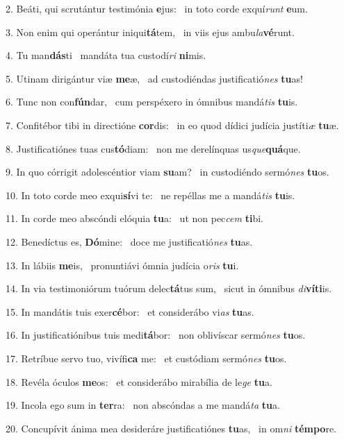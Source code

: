 2. Beáti, qui scrutántur testimónia \textbf{e}jus: \ast\  in toto corde exquí\textit{runt} \textbf{e}um.\

3. Non enim qui operántur iniqui\textbf{tá}tem, \ast\  in viis ejus ambu\textit{la}\textbf{vé}runt.\

4. Tu man\textbf{dás}ti \ast\  mandáta tua custodí\textit{ri} \textbf{ni}mis.\

5. Utinam dirigántur viæ \textbf{me}æ, \ast\  ad custodiéndas justificatió\textit{nes} \textbf{tu}as!\

6. Tunc non con\textbf{fún}dar, \ast\  cum perspéxero in ómnibus mandá\textit{tis} \textbf{tu}is.\

7. Confitébor tibi in directióne \textbf{cor}dis: \ast\  in eo quod dídici judícia justíti\textit{æ} \textbf{tu}æ.\

8. Justificatiónes tuas cus\textbf{tó}diam: \ast\  non me derelínquas us\textit{que}\textbf{quá}que.\

9. In quo córrigit adolescéntior viam \textbf{su}am? \ast\  in custodiéndo sermó\textit{nes} \textbf{tu}os.\

10. In toto corde meo exqui\textbf{sí}vi te: \ast\  ne repéllas me a mandá\textit{tis} \textbf{tu}is.\

11. In corde meo abscóndi elóquia \textbf{tu}a: \ast\  ut non pec\textit{cem} \textbf{ti}bi.\

12. Benedíctus es, \textbf{Dó}mine: \ast\  doce me justificatió\textit{nes} \textbf{tu}as.\

13. In lábiis \textbf{me}is, \ast\  pronuntiávi ómnia judícia o\textit{ris} \textbf{tu}i.\

14. In via testimoniórum tuórum delec\textbf{tá}tus sum, \ast\  sicut in ómnibus \textit{di}\textbf{ví}\textbf{ti}is.\

15. In mandátis tuis exer\textbf{cé}bor: \ast\  et considerábo vi\textit{as} \textbf{tu}as.\

16. In justificatiónibus tuis medi\textbf{tá}bor: \ast\  non oblivíscar sermó\textit{nes} \textbf{tu}os.\

17. Retríbue servo tuo, vivífi\textbf{ca} me: \ast\  et custódiam sermó\textit{nes} \textbf{tu}os.\

18. Revéla óculos \textbf{me}os: \ast\  et considerábo mirabília de le\textit{ge} \textbf{tu}a.\

19. Incola ego sum in \textbf{ter}ra: \ast\  non abscóndas a me mandá\textit{ta} \textbf{tu}a.\

20. Concupívit ánima mea desideráre justificatiónes \textbf{tu}as, \ast\  in om\textit{ni} \textbf{tém}\textbf{po}re.\

